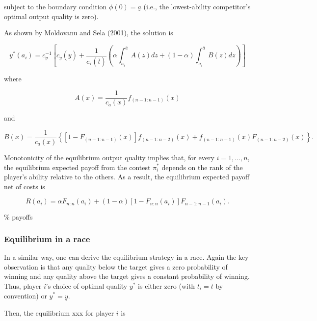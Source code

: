 \documentclass[11pt, titlepage]{article}
\newcommand\deadline{\bar{t}}
\newcommand\target{\underline{y}}
\newcommand\ctime{c_{\tau}}
\newcommand\cscore{c_{y}}
\newcommand\lotype{\underline{a}}
\newcommand\hitype{\bar{a}}
\begin{document}
subject to the boundary condition \(\phi(0) = \lotype\) (i.e., the
lowest-ability competitor's optimal output quality is zero).

As shown by Moldovanu and Sela (2001), the solution is

\begin{equation} \label{ystar}
y^*(a_i) = 
    \cscore^{-1}
    \left[\cscore(\target) 
    + \frac{1}{\ctime(\deadline)}
    \left(\alpha \int_{a_i}^{\hitype} A(z) dz
      + (1-\alpha) \int_{a_i}^{\hitype} B(z)  dz
    \right)
    \right]
\end{equation}

where

\begin{equation}
  A(x) = \frac{1}{c_{a}(x)} f_{(n-1:n-1)}(x)
\end{equation}

and

\begin{equation}
  B(x) = \frac{1}{c_{a}(x)} \left\{
      \left[1- F_{(n-1:n-1)}(x)\right]f_{(n-1:n-2)}(x)
      + f_{(n-1:n-1)}(x) F_{(n-1:n-2)}(x)
    \right\}.
\end{equation}

Monotonicity of the equilibrium output quality implies that, for every
\(i=1, ..., n\), the equilibrium expected payoff from the contest
\(\pi_i^*\) depends on the rank of the player's ability relative to the
others. As a result, the equilibrium expected payoff net of costs is

\begin{equation} 
    R(a_i) = \alpha F_{n:n}(a_i) + (1-\alpha)[1-F_{n:n}(a_i)] F_{n-1:n-1}(a_i).
\end{equation}

\% payoffs

\subsubsection{Equilibrium in a race}\label{equilibrium-in-a-race}

In a similar way, one can derive the equilibrium strategy in a race.
Again the key observation is that any quality below the target gives a
zero probability of winning and any quality above the target gives a
constant probability of winning. Thus, player \(i\)'s choice of optimal
quality \(y^*\) is either zero (with \(t_i=\deadline\) by convention) or
\(y^*=\target\).

Then, the equilibrium xxx for player \(i\) is
\end{document}
